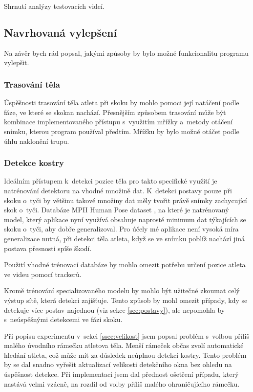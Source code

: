 Shrnutí analýzy testovacích videí.



\subsection{Navrhovaná vylepšení}

Na závěr bych rád popsal, jakými způsoby by bylo možné funkcionalitu programu vylepšit.


\subsubsection{Trasování těla}

Úspěšnosti trasování těla atleta při skoku by mohlo pomoci její natáčení podle fáze, ve které se skokan nachází. Přesnějším způsobem trasování může být kombinace implementovaného přístupu s~využitím mřížky a~metody otáčení snímku, kterou program používal předtím. Mřížku by bylo možné otáčet podle úhlu naklonění trupu.


\subsubsection{Detekce kostry}

Ideálním přístupem k~detekci pozice těla pro takto specifické využití je natrénování detektoru na vhodné množině dat. K~detekci postavy pouze při skoku o~tyči by většinu takové množiny dat měly tvořit právě snímky zachycující skok o~tyči. Databáze MPII Human Pose dataset \citep{MPIIHPE}, na které je natrénovaný model, který aplikace nyní využívá obsahuje naprosté minimum dat týkajících se skoku o~tyči, aby dobře generalizoval. Pro účely mé aplikace není vysoká míra generalizace nutná, při detekci těla atleta, když se ve snímku poblíž nachází jiná postava přesnosti spíše škodí.

Použití vhodné trénovací databáze by mohlo omezit potřebu určení pozice atleta ve videu pomocí trackerů.

Kromě trénování specializovaného modelu by mohlo být užitečné zkoumat celý výstup sítě, která detekci zajišťuje. Tento způsob by mohl omezit případy, kdy se detekuje více postav najednou (viz sekce \ref{sec:postavy}), ale nepomohla by s~neúspěšnými detekcemi ve fázi skoku.

Při popisu experimentu v~sekci \ref{ssec:velikost} jsem popsal problém s~volbou příliš malého úvodního rámečku atletova těla. Menší rámeček občas zvolí automatické hledání atleta, což může mít za důsledek neúplnou detekci kostry. Tento problém by se dal snadno vyřešit aktualizací velikosti detekčního okna bez ohledu na úspěšnost detekce. Při implementaci jsem dal přednost ošetření případu, který nastává velmi vzácně, na rozdíl od volby příliš malého ohraničujícího rámečku.

